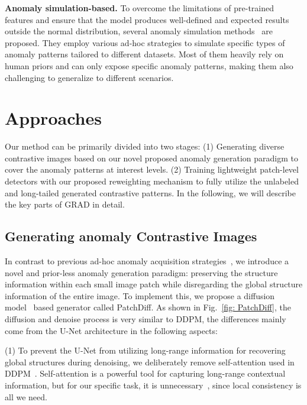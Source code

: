 \documentclass[letterpaper]{article} %
\begin{document}
\noindent\textbf{Anomaly simulation-based.}
To overcome the limitations of pre-trained features and ensure that the model produces well-defined and expected results outside the normal distribution, several anomaly simulation methods~\cite{FCDD, CutPaste, DRAEM, SLSG} are proposed. They employ various ad-hoc strategies to simulate specific types of anomaly patterns tailored to different datasets. Most of them heavily rely on human priors and can only expose specific anomaly patterns, making them also challenging to generalize to different scenarios.


\section{Approaches}

Our method can be primarily divided into two stages: (1) Generating diverse contrastive images based on our novel proposed anomaly generation paradigm to cover the anomaly patterns at interest levels. (2) Training lightweight patch-level detectors with our proposed reweighting mechanism to fully utilize the unlabeled and long-tailed generated contrastive patterns. In the following, we will describe the key parts of GRAD in detail.

\subsection{Generating anomaly Contrastive Images}
\label{sec: generating}

In contrast to previous ad-hoc anomaly acquisition strategies~\cite{CutPaste, DRAEM, SLSG}, we introduce a novel and prior-less anomaly generation paradigm: preserving the structure information within each small image patch while disregarding the global structure information of the entire image. To implement this, we propose a diffusion model~\cite{DDPM} based generator called PatchDiff.
As shown in Fig.~\ref{fig: PatchDiff}, the diffusion and denoise process is very similar to DDPM, the differences mainly come from the U-Net architecture in the following aspects:

(1) To prevent the U-Net from utilizing long-range information for recovering global structures during denoising, we deliberately remove self-attention used in DDPM~\cite{DDPM}. Self-attention is a powerful tool for capturing long-range contextual information, but for our specific task, it is unnecessary~\cite{AttentionNotNeed}, since local consistency is all we need.
\end{document}
